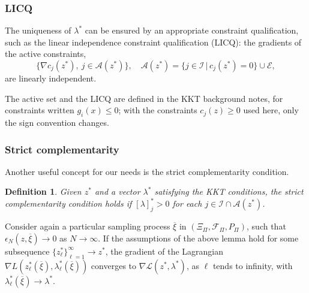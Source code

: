 \documentclass[aspectratio=169]{beamer}
\newtheorem{defi}{Definition}
\begin{document}
\begin{frame}
\frametitle{LICQ}





The uniqueness of $\lambda^*$ can be ensured by an appropriate constraint qualification, such as the {\red linear independence constraint qualification (LICQ)}: the gradients of the active constraints,
\[
\lbrace \nabla c_j(z^*),\ j \in \mathcal{A}(z^*) \rbrace, \quad
\mathcal{A}(z^*) = \lbrace j \in \mathcal{I} \, | \,
c_j(z^*) = 0 \rbrace \cup \mathcal{E},
\]
are linearly independent.

\mbox{}

{\footnotesize The active set and the LICQ are defined in the {\red KKT background notes}, for constraints written $g_i(x) \leq 0$; with the constraints $c_j(z) \geq 0$ used here, only the sign convention changes.}

\end{frame}

\begin{frame}
\frametitle{Strict complementarity}

Another useful concept for our needs is the strict complementarity condition.

\begin{defi}
Given $z^*$ and a vector $\lambda^*$ satisfying the KKT conditions, the strict complementarity condition holds if %
$[\lambda]_j^* > 0$ for each $j \in \mathcal{I} \cap \mathcal{A}(z^*)$.
\end{defi}

\mbox{}

Consider again a particular sampling process $\overline{\xi}$ in $(\Xi_{\Pi}, \mathcal{F}_{\Pi}, P_{\Pi})$, such that $\epsilon_N (z, \overline{\xi} ) \rightarrow 0$ as $N \rightarrow \infty$. 
If the assumptions of the above lemma hold for some subsequence $\lbrace z_{\ell}^* \rbrace_{\ell = 1}^{\infty} \rightarrow z^*$, the gradient of the Lagrangian $\nabla L\left( z^*_{\ell} ( \overline{\xi} ), \lambda_{\ell}^* ( \overline{\xi} ) \right)$ converges to $\nabla \mathcal{L} ( z^*, \lambda^* )$, as $\ell$ tends to infinity, with $\lambda_{\ell}^*(\overline{\xi}) \rightarrow \lambda^*$.

\end{frame}
\end{document}
